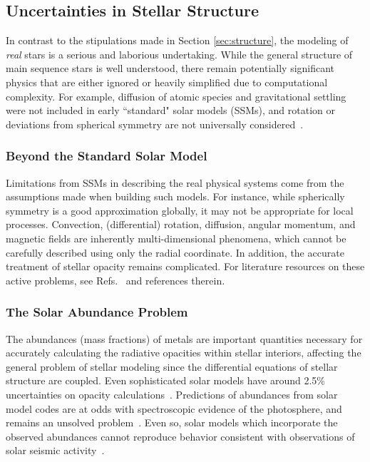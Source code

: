 \documentclass[12pt]{article}
\begin{document}
\subsection{Uncertainties in Stellar Structure}
In contrast to the stipulations made in Section \ref{sec:structure}, the modeling of \textit{real} stars is a serious and laborious undertaking. While the general structure of main sequence stars is well understood, there remain potentially significant physics that are either ignored or heavily simplified due to computational complexity. For example, diffusion of atomic species and gravitational settling were not included in early ``standard" solar models (SSMs), and rotation or deviations from spherical symmetry are not universally considered~\cite{Christensen_Dalsgaard_2021}.

\subsubsection{Beyond the Standard Solar Model}
Limitations from SSMs in describing the real physical systems come from the assumptions made when building such models. For instance, while spherically symmetry is a good approximation globally, it may not be appropriate for local processes. Convection, (differential) rotation, diffusion, angular momentum, and magnetic fields are inherently multi-dimensional phenomena, which cannot be carefully described using only the radial coordinate. In addition, the accurate treatment of stellar opacity remains complicated. For literature resources on these active problems, see Refs.~\cite{Vinyoles_2017,Gough_2015,Turck2011} and references therein.

\subsubsection{The Solar Abundance Problem}
The abundances (mass fractions) of metals are important quantities necessary for accurately calculating the radiative opacities within stellar interiors, affecting the general problem of stellar modeling since the differential equations of stellar structure are coupled. Even sophisticated solar models have around 2.5\% uncertainties on opacity calculations~\cite{Villante2019AnUD}. Predictions of abundances from solar model codes are at odds with spectroscopic evidence of the photosphere, and remains an unsolved problem~\cite{Bergemann_2014}. Even so, solar models which incorporate the observed abundances cannot reproduce behavior consistent with observations of solar seismic activity~\cite{Villante2019AnUD}. 
\end{document}
